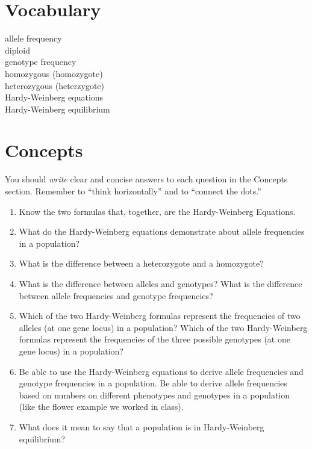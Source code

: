 \documentclass[letterpaper]{tufte-handout}
\begin{document}
\section*{Vocabulary}

\vspace{-1\baselineskip}
\begin{multicols}{2}
allele frequency \\
diploid\\
genotype frequency \\
homozygous (homozygote) \\
heterozygous (heterzygote) \\
Hardy-Weinberg equations \\
Hardy-Weinberg equilibrium
\end{multicols}

\section*{Concepts}

You should \emph{write} clear and concise answers to each question in the Concepts section.  Remember to ``think horizontally'' and to ``connect the dots.'' 

\begin{enumerate}

	\item Know the two formulas that, together, are the Hardy-Weinberg Equations.

	\item What do the Hardy-Weinberg equations demonstrate about allele frequencies in a population?

	\item What is the difference between a heterozygote and a homozygote?

	\item What is the difference between alleles and genotypes?  What is the difference between allele frequencies and genotype frequencies?

	\item Which of the two Hardy-Weinberg formulas represent the frequencies of two alleles (at one gene locus) in a population?  Which of the two Hardy-Weinberg formulas represent the frequencies of the three possible genotypes (at one gene locus) in a population?

	\item Be able to use the Hardy-Weinberg equations to derive allele frequencies and genotype frequencies in a population.  Be able to derive allele frequencies based on numbers on different phenotypes and genotypes in a population (like the flower example we worked in class). 

	\item What does it mean to say that a population is in Hardy-Weinberg equilibrium?

\end{enumerate}
\end{document}
